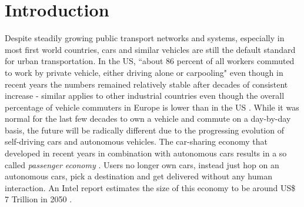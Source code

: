 \documentclass{llncs}
\begin{document}
{\begin{abstract}
	\end{abstract}
	
	

	
	\section{Introduction}
		\label{s:introduction}

		Despite steadily growing public transport networks and systems, especially in most first world countries, cars and similar vehicles are still the default standard for urban transportation. In the US, ``about 86 percent of all workers commuted to work by private vehicle, either driving alone or carpooling" \cite{mckenzie2015drives} even though in recent years the numbers remained relatively stable after decades of consistent increase - similar applies to other industrial countries \cite{netherlandsPublicTransport}\cite{zealand2006car} even though the overall percentage of vehicle commuters in Europe is lower than in the US \cite{commuteUSvsEurope}. While it was normal for the last few decades to own a vehicle and commute on a day-by-day basis, the future will be radically different due to the progressing evolution of self-driving cars and autonomous vehicles. The car-sharing economy that developed in recent years in combination with autonomous cars results in a so called \textit{passenger economy} \cite{intelPassengerEconomy}. Users no longer own cars, instead just hop on an autonomous cars, pick a destination and get delivered without any human interaction. An Intel report estimates the size of this economy to be around US\$ 7 Trillion in 2050 \cite{intelPassengerEconomy}.
		
}
\end{document}
